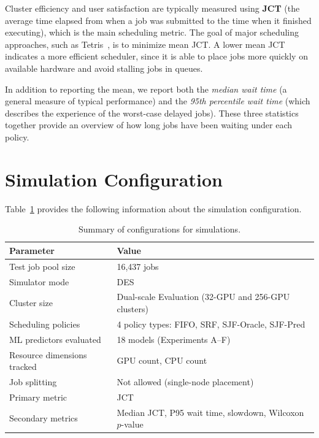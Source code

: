 Cluster efficiency and user satisfaction are typically measured using \textbf{JCT} (the average time elapsed from when a job was submitted to the time when it finished executing), which is the main scheduling metric. The goal of major scheduling approaches, such as Tetris~\cite{grandl2014multi}, is to minimize mean JCT. A lower mean JCT indicates a more efficient scheduler, since it is able to place jobs more quickly on available hardware and avoid stalling jobs in queues.

In addition to reporting the mean, we report both the \textit{median wait time} (a general measure of typical performance) and the \textit{95th percentile wait time} (which describes the experience of the worst-case delayed jobs). These three statistics together provide an overview of how long jobs have been waiting under each policy.

\section{Simulation Configuration}

Table~\ref{tab:simconfig} provides the following information about the simulation configuration.

\begin{table}[htbp]
\centering
\caption[Summary of configurations for simulations]{Summary of configurations for simulations.}
\label{tab:simconfig}
\begin{tabular}{ll}
\hline
\textbf{Parameter} & \textbf{Value} \\ 
\hline
Test job pool size          & 16{,}437 jobs \\ 
Simulator mode              & DES \\ 
Cluster size                & Dual-scale Evaluation (32-GPU and 256-GPU clusters) \\ 
Scheduling policies         & 4 policy types: FIFO, SRF, SJF-Oracle, SJF-Pred \\ 
ML predictors evaluated     & 18 models (Experiments A--F) \\ 
Resource dimensions tracked & GPU count, CPU count \\ 
Job splitting               & Not allowed (single-node placement) \\ 
Primary metric              & JCT \\ 
Secondary metrics           & Median JCT, P95 wait time, slowdown, Wilcoxon $p$-value \\ 
\hline
\end{tabular}
\end{table}

